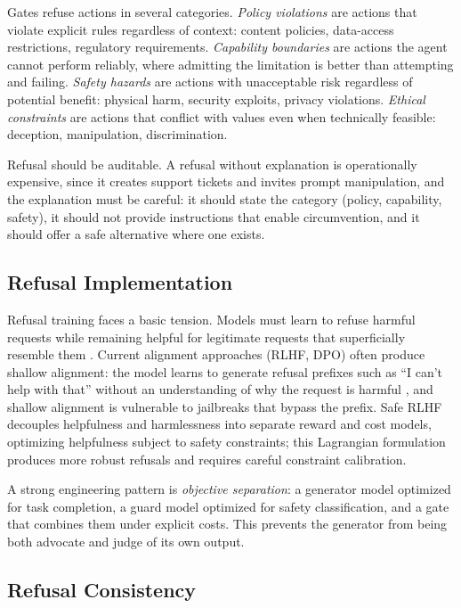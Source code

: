 \documentclass[11pt]{book}
\begin{document}
Gates refuse actions in several categories. \textit{Policy violations} are actions that violate explicit rules regardless of context: content policies, data-access restrictions, regulatory requirements. \textit{Capability boundaries} are actions the agent cannot perform reliably, where admitting the limitation is better than attempting and failing. \textit{Safety hazards} are actions with unacceptable risk regardless of potential benefit: physical harm, security exploits, privacy violations. \textit{Ethical constraints} are actions that conflict with values even when technically feasible: deception, manipulation, discrimination.

Refusal should be auditable. A refusal without explanation is operationally expensive, since it creates support tickets and invites prompt manipulation, and the explanation must be careful: it should state the category (policy, capability, safety), it should not provide instructions that enable circumvention, and it should offer a safe alternative where one exists.

\subsection{Refusal Implementation}

Refusal training faces a basic tension. Models must learn to refuse harmful requests while remaining helpful for legitimate requests that superficially resemble them \cite{qi2024alignment}. Current alignment approaches (RLHF, DPO) often produce shallow alignment: the model learns to generate refusal prefixes such as ``I can't help with that'' without an understanding of why the request is harmful \cite{qi2025shallow}, and shallow alignment is vulnerable to jailbreaks that bypass the prefix. Safe RLHF \cite{dai2024safe} decouples helpfulness and harmlessness into separate reward and cost models, optimizing helpfulness subject to safety constraints; this Lagrangian formulation produces more robust refusals and requires careful constraint calibration.

A strong engineering pattern is \textit{objective separation}: a generator model optimized for task completion, a guard model optimized for safety classification, and a gate that combines them under explicit costs. This prevents the generator from being both advocate and judge of its own output.

\subsection{Refusal Consistency}
\end{document}
